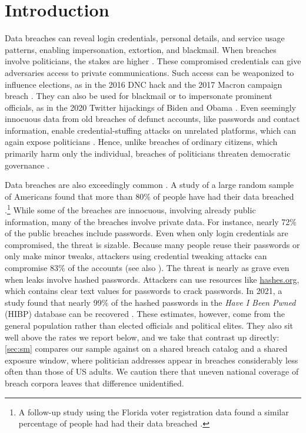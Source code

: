 \documentclass[12pt, letterpaper]{article}
\begin{document}
\section{Introduction} 
Data breaches can reveal login credentials, personal details, and service usage patterns, enabling impersonation, extortion, and blackmail. When breaches involve politicians, the stakes are higher \citep{dnc2016hack_guardian, twitterhack2020, twitterhackwitman2022}. These compromised credentials can give adversaries access to private communications. Such access can be weaponized to influence elections, as in the 2016 DNC hack and the 2017 Macron campaign breach \citep{dnc2016hack_guardian, dnc2016hack_crowdstrike, macron2017hack, shires2019}. They can also be used for blackmail or to impersonate prominent officials, as in the 2020 Twitter hijackings of Biden and Obama \citep{twitterhack2020, twitterhackwitman2022}. Even seemingly innocuous data from old breaches of defunct accounts, like passwords and contact information, enable credential-stuffing attacks on unrelated platforms, which can again expose politicians \citep{pal2022might, OWASPCredStuff, li2019protocols, gabbard2025wired}. Hence, unlike breaches of ordinary citizens, which primarily harm only the individual, breaches of politicians threaten democratic governance \citep{shires2019}.

Data breaches are also exceedingly common \citep{sood2019pwned, mayer2021angry, Sood_Have_I_Been_2023}. A study of a large random sample of Americans found that more than 80\% of people have had their data breached \citep{sood2019pwned}.\footnote{A follow-up study using the Florida voter registration data found a similar percentage of people had had their data breached \citep{Sood_Have_I_Been_2023}.} While some of the breaches are innocuous, involving already public information, many of the breaches involve private data. For instance, nearly 72\% of the public breaches include passwords. Even when only login credentials are compromised, the threat is sizable. Because many people reuse their passwords or only make minor tweaks, attackers using credential tweaking attacks can compromise 83\% of the accounts \citep{li2019protocols} (see also \cite{Chintalapati_Pass-Fail_Using_a_2022}). The threat is nearly as grave even when leaks involve hashed passwords. Attackers can use resources like \url{hashes.org}, which contains clear text values for passwords to crack passwords. In 2021, a study found that nearly 99\% of the hashed passwords in the \textit{Have I Been Pwned} (HIBP) database can be recovered \citep{kanta2021viable}.
These estimates, however, come from the general population rather than elected officials and political elites. They also sit well above the rates we report below, and we take that contrast up directly: \cref{sec:sm} compares our sample against \citet{sood2019pwned} on a shared breach catalog and a shared exposure window, where politician addresses appear in breaches considerably less often than those of US adults. We caution there that uneven national coverage of breach corpora leaves that difference unidentified.
\end{document}
